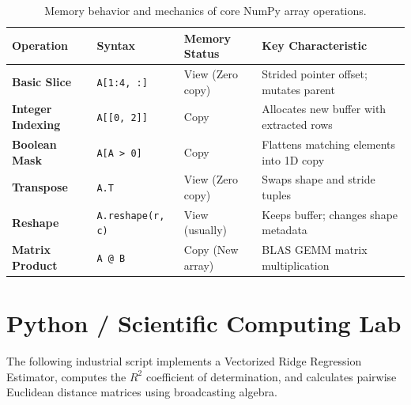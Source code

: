 \begin{table}[htbp]
\centering
\small
\begin{tabular}{p{2.6cm} p{2.4cm} p{2.2cm} p{4.6cm}}
\hline
\textbf{Operation} & \textbf{Syntax} & \textbf{Memory Status} & \textbf{Key Characteristic} \\
\hline
\textbf{Basic Slice} & \texttt{A[1:4, :]} & View (Zero copy) & Strided pointer offset; mutates parent \\
\textbf{Integer Indexing} & \texttt{A[[0, 2]]} & Copy & Allocates new buffer with extracted rows \\
\textbf{Boolean Mask} & \texttt{A[A > 0]} & Copy & Flattens matching elements into 1D copy \\
\textbf{Transpose} & \texttt{A.T} & View (Zero copy) & Swaps shape and stride tuples \\
\textbf{Reshape} & \texttt{A.reshape(r, c)} & View (usually) & Keeps buffer; changes shape metadata \\
\textbf{Matrix Product} & \texttt{A @ B} & Copy (New array) & BLAS GEMM matrix multiplication \\
\hline
\end{tabular}
\caption{Memory behavior and mechanics of core NumPy array operations.}
\label{tab:numpy_memory}
\end{table}

\section{Python / Scientific Computing Lab}

The following industrial script implements a Vectorized Ridge Regression Estimator, computes the $R^2$ coefficient of determination, and calculates pairwise Euclidean distance matrices using broadcasting algebra.


